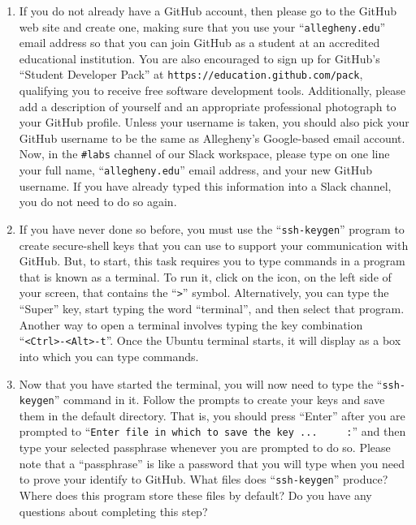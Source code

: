\documentclass[11pt]{article}
\newcommand{\command}[1]{``\lstinline{#1}''}
\newcommand{\url}[1]{\lstinline{#1}}
\newcommand{\channel}[1]{\lstinline{#1}}
\begin{document}
\begin{enumerate}

  \itemsep 0in

  \item If you do not already have a GitHub account, then please go to the
    GitHub web site and create one, making sure that you use your
    \command{allegheny.edu} email address so that you can join GitHub as a
    student at an accredited educational institution. You are also encouraged to
    sign up for GitHub's ``Student Developer Pack'' at
    \url{https://education.github.com/pack}, qualifying you to receive free
    software development tools. Additionally, please add a description of
    yourself and an appropriate professional photograph to your GitHub profile.
    Unless your username is taken, you should also pick your GitHub username to
    be the same as Allegheny's Google-based email account. Now, in the
    \channel{#labs} channel of our Slack workspace, please type on one line your
    full name, \command{allegheny.edu} email address, and your new GitHub
    username. If you have already typed this information into a Slack channel,
    you do not need to do so again.

  \item If you have never done so before, you must use the \command{ssh-keygen}
    program to create secure-shell keys that you can use to support your
    communication with GitHub. But, to start, this task requires you to type
    commands in a program that is known as a terminal. To run it, click on the
    icon, on the left side of your screen, that contains the \command{>} symbol.
    Alternatively, you can type the ``Super'' key, start typing the word
    ``terminal'', and then select that program. Another way to open a terminal
    involves typing the key combination \command{<Ctrl>-<Alt>-t}. Once the
    Ubuntu terminal starts, it will display as a box into which you can type
    commands.

  \item Now that you have started the terminal, you will now need to type the
    \command{ssh-keygen} command in it. Follow the prompts to create your keys
    and save them in the default directory. That is, you should press ``Enter''
    after you are prompted to \command{Enter file in which to save the key ...
    :} and then type your selected passphrase whenever you are prompted to do
    so. Please note that a ``passphrase'' is like a password that you will type
    when you need to prove your identify to GitHub. What files does
    \command{ssh-keygen} produce? Where does this program store these files by
    default? Do you have any questions about completing this step?


\end{enumerate}
\end{document}
